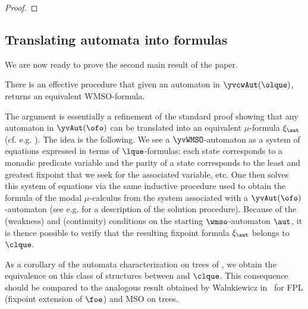 \begin{proof}
%
\end{proof}


\subsection{Translating automata into formulas}
We are now ready to prove the second main result of the paper.

\begin{theorem}\label{thm:wmso_autofor}
There is an effective procedure that given an automaton in $\yvcwAut({\olque})$, returns an equivalent WMSO-formula.
\end{theorem}
\begin{proofsketch}
The argument   is
 essentially a refinement of the standard proof showing that any automaton in $\yvAut(\ofo)$ can be translated into an equivalent $\mu$-formula
$\xi_\aut$ (cf. e.g. \cite{Ven08}).
The idea is the following. We see a $\yvWMSO$-automaton as a system of equations expressed in terms of $\lque$-formulas: each state corresponds to a monadic predicate variable and the parity of a state corresponds to the least and greatest fixpoint that we seek for the associated variable, etc. One then solves this system of equations via the same inductive procedure used to obtain the formula of the modal $\mu$-calculus from the system associated with a  $\yvAut(\ofo)$-automaton (see e.g. \cite{ArnoldN01} for a description of the solution procedure). Because of the (weakness) and (continuity) conditions on the starting $\wmso$-automaton $\aut$, it is thence possible to verify that the resulting fixpoint formula $\xi_\aut$ belongs to $\clque$.
\end{proofsketch}

\begin{remark}
As a corollary of the automata characterization on trees of \wmso, we obtain the equivalence on this class of structures between \wmso and $\clque$. This consequence should be compared to the analogous result obtained by Walukiewicz in~\cite{Walukiewicz96} for FPL (fixpoint extension of $\foe$) and MSO on trees.
\end{remark}

